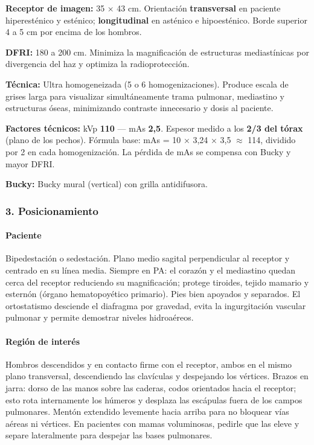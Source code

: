 	\textbf{Receptor de imagen:} 35 × 43 cm. Orientación \textbf{transversal} en paciente hiperesténico y esténico; \textbf{longitudinal} en asténico e hipoesténico. Borde superior 4 a 5 cm por encima de los hombros.
	
	\textbf{DFRI:} 180 a 200 cm. Minimiza la magnificación de estructuras mediastínicas por divergencia del haz y optimiza la radioprotección.
	
	\textbf{Técnica:} Ultra homogeneizada (5 o 6 homogenizaciones). Produce escala de grises larga para visualizar simultáneamente trama pulmonar, mediastino y estructuras óseas, minimizando contraste innecesario y dosis al paciente.
	
	\textbf{Factores técnicos:} kVp \textbf{110} --- mAs \textbf{2,5}. Espesor medido a los \textbf{2/3 del tórax} (plano de los pechos). Fórmula base: mAs = 10 × 3,24 × 3,5 $\approx$ 114, dividido por 2 en cada homogenización. La pérdida de mAs se compensa con Bucky y mayor DFRI.
	
	\textbf{Bucky:} Bucky mural (vertical) con grilla antidifusora.
	
	\subsubsection*{3. Posicionamiento}
	
	\paragraph{Paciente}
	Bipedestación o sedestación. Plano medio sagital perpendicular al receptor y centrado en su línea media. Siempre en PA: el corazón y el mediastino quedan cerca del receptor reduciendo su magnificación; protege tiroides, tejido mamario y esternón (órgano hematopoyético primario). Pies bien apoyados y separados. El ortostatismo desciende el diafragma por gravedad, evita la ingurgitación vascular pulmonar y permite demostrar niveles hidroaéreos.
	
	\paragraph{Región de interés}
	Hombros descendidos y en contacto firme con el receptor, ambos en el mismo plano transversal, descendiendo las clavículas y despejando los vértices. Brazos en jarra: dorso de las manos sobre las caderas, codos orientados hacia el receptor; esto rota internamente los húmeros y desplaza las escápulas fuera de los campos pulmonares. Mentón extendido levemente hacia arriba para no bloquear vías aéreas ni vértices. En pacientes con mamas voluminosas, pedirle que las eleve y separe lateralmente para despejar las bases pulmonares.
	
